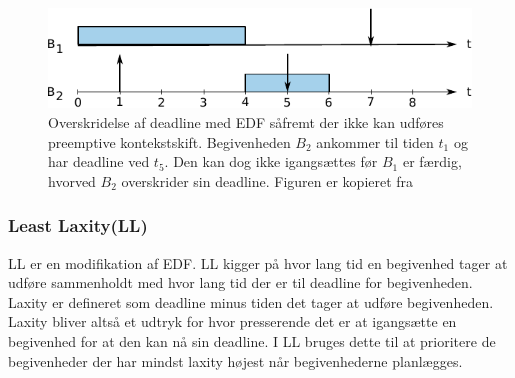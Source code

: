 \begin{figure}
 \begin{center}
  \includegraphics[scale=1.00]{images/edf-nonpreemptive}
  \caption{Overskridelse af deadline med EDF såfremt der ikke kan udføres preemptive kontekstskift. Begivenheden $B_2$ ankommer til tiden $t_1$ og har deadline ved $t_5$. Den kan dog ikke igangsættes før $B_1$ er færdig, hvorved $B_2$ overskrider sin deadline. Figuren er kopieret fra \cite[56]{buttazzo2005}}
  \label{fig:edf-nonpreemptive}
  \end{center}
\end{figure}

\subsubsection{Least Laxity(LL)}
LL er en modifikation af EDF. LL kigger på hvor lang tid en begivenhed tager at udføre sammenholdt med hvor lang tid der er til deadline for begivenheden. Laxity er defineret som deadline minus tiden det tager at udføre begivenheden. Laxity bliver altså et udtryk for hvor presserende det er at igangsætte en begivenhed for at den kan nå sin deadline. I LL bruges dette til at prioritere de begivenheder der har mindst laxity højest når begivenhederne planlægges. 
